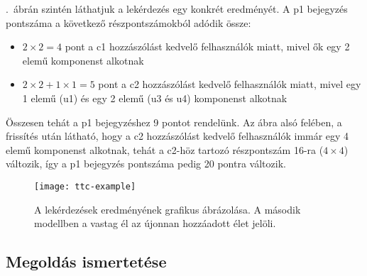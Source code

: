 .~ábrán szintén láthatjuk a lekérdezés egy konkrét eredményét. A \textsf{p1} bejegyzés pontszáma a következő részpontszámokból adódik össze:
\begin{itemize}
	\item $2 \times 2 = 4$ pont a \textsf{c1} hozzászólást kedvelő felhasználók miatt, mivel ők egy 2 elemű komponenst alkotnak
	\item $2 \times 2 + 1 \times 1 = 5$ pont a \textsf{c2} hozzászólást kedvelő felhasználók miatt, mivel egy 1 elemű (\textsf{u1}) és egy 2 elemű (\textsf{u3} és \textsf{u4}) komponenst alkotnak
\end{itemize}
Összesen tehát a \textsf{p1} bejegyzéshez 9 pontot rendelünk. Az ábra alsó felében, a frissítés után látható, hogy a \textsf{c2} hozzászólást kedvelő felhasználók immár egy 4 elemű komponenst alkotnak, tehát a \textsf{c2}-höz tartozó részpontszám 16-ra ($4 \times 4$) változik, így a \textsf{p1} bejegyzés pontszáma pedig 20 pontra változik.

\begin{figure}
	\centering
	\texttt{[image: ttc-example]}	
	\caption{A lekérdezések eredményének grafikus ábrázolása. A második modellben a vastag él az újonnan hozzáadott élet jelöli.}
	\label{fig:ttc-example}
\end{figure}

\subsection{Megoldás ismertetése}

